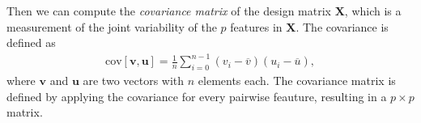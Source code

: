 \noindent Then we can compute the \textit{covariance matrix} of the design matrix $\boldsymbol{X}$, which is a measurement of the joint variability of the $p$ features in $\boldsymbol{X}$. The covariance is defined as
\begin{align}
\mathrm{cov}[\boldsymbol{v},\boldsymbol{u}] =\frac{1}{n} \sum_{i=0}^{n-1}(v_i- \overline{v})(u_i- \overline{u}),
\end{align}
where $\boldsymbol{v}$ and $\boldsymbol{u}$ are two vectors with $n$ elements each. The covariance matrix is defined by applying the covariance for every pairwise feauture, resulting in a $p\times p$ matrix. \begin{comment}On the diagonal, the covariance of two equal features becomes the variance of one,
\begin{align}
  \mathrm{cov}[\boldsymbol{u},\boldsymbol{u}] &=\frac{1}{n} \sum_{i=0}^{n-1}(u_i- \overline{u})(u_i- \overline{u}) = \mathrm{var}[\boldsymbol{u}].
\end{align}
The covariance can take values between $\pm \infty$, which give rise to computational issues due to loss of numerical precision. Therefore, we scale the covariance matrix by the variance. This is known as the correlation function
\begin{align}
  \mathrm{corr}[\boldsymbol{u},\boldsymbol{v}]=\frac{\mathrm{cov}[\boldsymbol{u},\boldsymbol{v}]}{\sqrt{\mathrm{var}[\boldsymbol{u}] \mathrm{var}[\boldsymbol{v}]}}.
\end{align}
Since all values are inbetween $-1$ and $1$, we avoid any loss of numerical precision. The resulting covariance matrix $\boldsymbol{C} \in {\mathbb{R}}^{p\times p}$ becomes


\end{comment}
